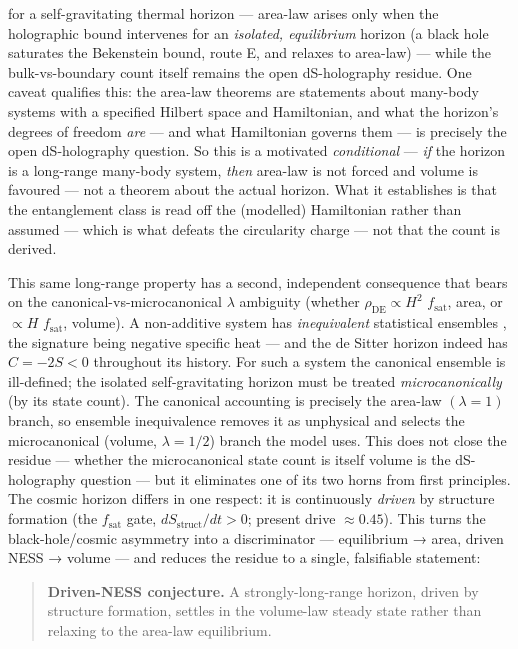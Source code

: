 \documentclass[aps,prd,preprint,nofootinbib,superscriptaddress]{revtex4-2}
\begin{document}
for a self-gravitating thermal horizon --- area-law arises only when the
holographic bound intervenes for an \emph{isolated, equilibrium} horizon
(a black hole saturates the Bekenstein bound, route E, and relaxes to
area-law) --- while the bulk-vs-boundary count itself remains the open
dS-holography residue. One caveat qualifies this: the area-law theorems
are statements about many-body systems with a specified Hilbert space
and Hamiltonian, and what the horizon's degrees of freedom \emph{are}
--- and what Hamiltonian governs them --- is precisely the open
dS-holography question. So this is a motivated \emph{conditional} ---
\emph{if} the horizon is a long-range many-body system, \emph{then}
area-law is not forced and volume is favoured --- not a theorem about
the actual horizon. What it establishes is that the entanglement class
is read off the (modelled) Hamiltonian rather than assumed --- which is
what defeats the circularity charge --- not that the count is derived.

This same long-range property has a second, independent consequence that
bears on the canonical-vs-microcanonical \(\lambda\) ambiguity (whether
\(\rho _\mathrm{DE} \propto  H^{2}\) \(f_{\mathrm{sat}}\), area, or
\(\propto  H\) \(f_{\mathrm{sat}}\), volume). A non-additive system has
\emph{inequivalent} statistical ensembles \cite{Campa:2009jxa}, the
signature being negative specific heat --- and the de Sitter horizon
indeed has \(C = -2S < 0\) throughout its history. For such a system the
canonical ensemble is ill-defined; the isolated self-gravitating horizon
must be treated \emph{microcanonically} (by its state count). The
canonical accounting is precisely the area-law \((\lambda  = 1)\)
branch, so ensemble inequivalence removes it as unphysical and selects
the microcanonical (volume, \(\lambda  = 1/2\)) branch the model uses.
This does not close the residue --- whether the microcanonical state
count is itself volume is the dS-holography question --- but it
eliminates one of its two horns from first principles. The cosmic
horizon differs in one respect: it is continuously \emph{driven} by
structure formation (the \(f_{\mathrm{sat}}\) gate,
\(dS_{\mathrm{struct}}/dt > 0\); present drive \(\approx  0.45\)). This
turns the black-hole/cosmic asymmetry into a discriminator ---
equilibrium → area, driven NESS → volume --- and reduces the residue to
a single, falsifiable statement:

\begin{quote}
\textbf{Driven-NESS conjecture.} A strongly-long-range horizon, driven
by structure formation, settles in the volume-law steady state rather
than relaxing to the area-law equilibrium.
\end{quote}
\end{document}
